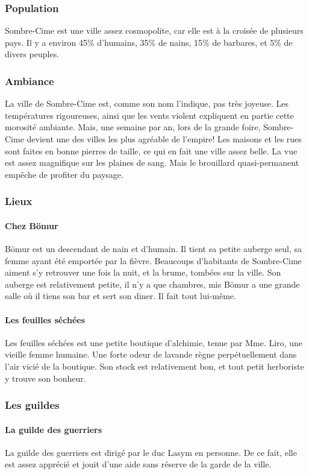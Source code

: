 \subsubsection{Population}
Sombre-Cime est une ville assez cosmopolite, car elle est à la croisée de plusieurs pays.
Il y a environ 45\% d'humains, 35\% de nains, 15\% de barbares, et 5\% de divers peuples.
\subsubsection{Ambiance}
La ville de Sombre-Cime est, comme son nom l'indique, pas très joyeuse. 
Les températures rigoureuses, ainsi que les vents violent expliquent en partie cette morosité ambiante.
Mais, une semaine par an, lors de la grande foire, Sombre-Cime devient une des villes les plus agréable de l'empire!
Les maisons et les rues sont faites en bonne pierres de taille, ce qui en fait une ville assez belle.
La vue est assez magnifique sur les plaines de sang. 
Mais le brouillard quasi-permanent empêche de profiter du paysage.
\subsubsection{Lieux}
\paragraph{Chez Bömur}
Bömur est un descendant de nain et d'humain. 
Il tient sa petite auberge seul, sa femme ayant été emportée par la fièvre.
Beaucoups d'habitants de Sombre-Cime aiment s'y retrouver une fois la nuit, et la brume, tombées sur la ville.
Son auberge est relativement petite, il n'y a que  chambres, mis Bömur a une grande salle où il tiens son bar et sert son diner.
Il fait tout lui-même.
\paragraph{Les feuilles séchées}
Les feuilles séchées est une petite boutique d’alchimie, tenue par Mme. Liro, une vieille femme humaine. Une forte odeur de lavande règne perpétuellement dans l’air vicié de la boutique. Son stock est relativement bon, et tout petit herboriste y trouve son bonheur. 
\subsubsection{Les guildes}
\paragraph{La guilde des guerriers}
La guilde des guerriers est dirigé par le duc Lasym en personne. De ce fait, elle est assez apprécié et jouit d’une aide sans réserve de la garde de la ville.
